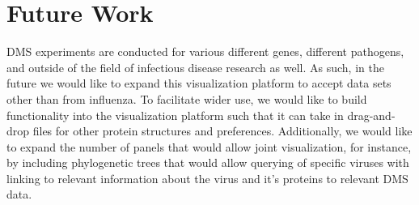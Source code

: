 \documentclass[sigchi]{acmart}
\begin{document}
\section{Future Work}

DMS experiments are conducted for various different genes, different pathogens, and outside of the field of infectious disease research as well. As such, in the future we would like to expand this visualization platform to accept data sets other than from influenza. To facilitate wider use, we would like to build functionality into the visualization platform such that it can take in drag-and-drop files for other protein structures and preferences. Additionally, we would like to expand the number of panels that would allow joint visualization, for instance, by including phylogenetic trees that would allow querying of specific viruses with linking to relevant information about the virus and it’s proteins to relevant DMS data.



\end{document}
